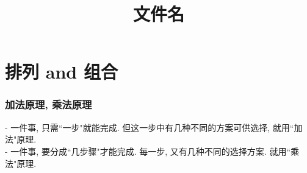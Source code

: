\documentclass[UTF8]{ctexart}
\title{文件名}
\begin{document}
	\tableofcontents %
	\date{} %
	\maketitle  %
	
	
	
	\part{排列 and 组合}
	
	\section{加法原理, 乘法原理}
	
	- 一件事, 只需``一步"就能完成. 但这一步中有几种不同的方案可供选择, 就用``加法"原理. \\	
	- 一件事, 要分成``几步骤"才能完成. 每一步, 又有几种不同的选择方案. 就用``乘法"原理. \\
	
\end{document}
